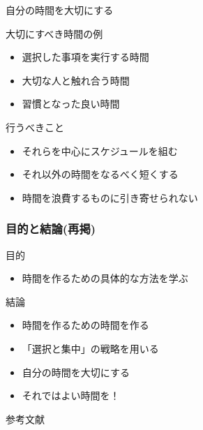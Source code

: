 \documentclass[dvipdfmx]{beamer}
\theoremstyle{example}
\begin{document}
\begin{frame}{自分の時間を大切にする}
  \begin{block}{大切にすべき時間の例}
    \begin{itemize}
      \item 選択した事項を実行する時間
      \item 大切な人と触れ合う時間
      \item 習慣となった良い時間
    \end{itemize}
  \end{block}

  \begin{exampleblock}{行うべきこと}
    \begin{itemize}
      \item それらを中心にスケジュールを組む
      \item それ以外の時間をなるべく短くする
      \item 時間を浪費するものに引き寄せられない
    \end{itemize}
  \end{exampleblock}


\end{frame}

\begin{frame}
  \frametitle{目的と結論(再掲)}
  \begin{block}{目的}
    \begin{itemize}
      \item 時間を作るための具体的な方法を学ぶ
    \end{itemize}
  \end{block}

  \begin{exampleblock}{結論}
    \begin{itemize}
      \item 時間を作るための時間を作る
      \item 「選択と集中」の戦略を用いる
      \item 自分の時間を大切にする
    \end{itemize}
  \end{exampleblock}
  \begin{itemize}
    \item それではよい時間を！
  \end{itemize}
\end{frame}

\begin{frame}[allowframebreaks]{参考文献}
    \scriptsize
    \beamertemplatetextbibitems
    
    
\end{frame}
\end{document}
